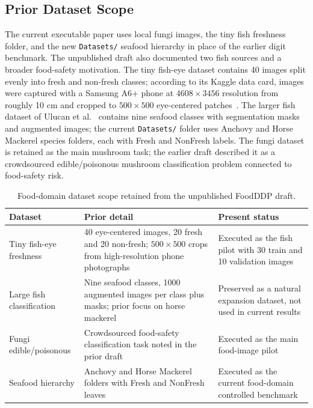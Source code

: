 \documentclass[conference]{IEEEtran}
\begin{document}
\subsection{Prior Dataset Scope}

The current executable paper uses local fungi images, the tiny fish freshness folder, and the new \texttt{Datasets/} seafood hierarchy in place of the earlier digit benchmark. The unpublished draft also documented two fish sources and a broader food-safety motivation. The tiny fish-eye dataset contains 40 images split evenly into fresh and non-fresh classes; according to its Kaggle data card, images were captured with a Samsung A6+ phone at \(4608\times3456\) resolution from roughly 10 cm and cropped to \(500\times500\) eye-centered patches~\cite{agustyawan2020fish}. The larger fish dataset of Ulucan et al.~\cite{ulucan2020fish} contains nine seafood classes with segmentation masks and augmented images; the current \texttt{Datasets/} folder uses Anchovy and Horse Mackerel species folders, each with Fresh and NonFresh labels. The fungi dataset is retained as the main mushroom task; the earlier draft described it as a crowdsourced edible/poisonous mushroom classification problem connected to food-safety risk.

\begin{table}[t]
\centering
\caption{Food-domain dataset scope retained from the unpublished FoodDDP draft.}
\label{tab:legacydatasets}
\small
\begin{tabular}{p{}p{}p{}}
\toprule
Dataset & Prior detail & Present status \\
\midrule
Tiny fish-eye freshness & 40 eye-centered images, 20 fresh and 20 non-fresh; \(500\times500\) crops from high-resolution phone photographs~\cite{agustyawan2020fish} & Executed as the fish pilot with 30 train and 10 validation images \\
Large fish classification & Nine seafood classes, 1000 augmented images per class plus masks; prior focus on horse mackerel~\cite{ulucan2020fish} & Preserved as a natural expansion dataset, not used in current results \\
Fungi edible/poisonous & Crowdsourced food-safety classification task noted in the prior draft & Executed as the main food-image pilot \\
Seafood hierarchy & Anchovy and Horse Mackerel folders with Fresh and NonFresh leaves & Executed as the current food-domain controlled benchmark \\
\bottomrule
\end{tabular}
\end{table}
\end{document}

